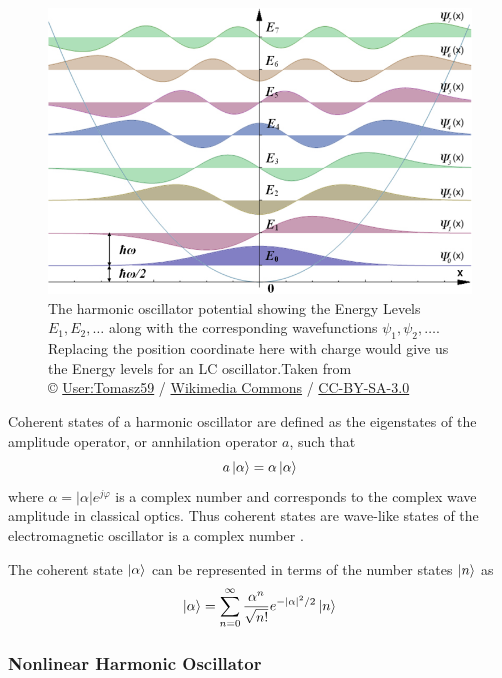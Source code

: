 \begin{figure}
\centering
\includegraphics[width=\linewidth]{Figures/harmonic_oscillator}
\decoRule
\caption[Harmonic Oscillator Energy Levels]{The harmonic oscillator potential showing the Energy Levels $E_1,E_2,\ldots$ along with the corresponding wavefunctions $\psi_1,\psi_2,\ldots$. Replacing the position coordinate here with charge would give us the Energy levels for an LC oscillator.Taken from \\© \href{https://pl.wikipedia.org/wiki/Wikipedysta:Tomasz59}{User:Tomasz59} / \href{http://commons.wikimedia.org/}{Wikimedia Commons} / \href{http://creativecommons.org/licenses/by-sa/3.0/}{CC-BY-SA-3.0}}
\label{fig:harmonic oscillator}
\end{figure}

Coherent states of a harmonic oscillator are defined as the eigenstates of the amplitude operator, or annhilation operator $a$, such that
\begin{equation}
a\ket{\alpha} = \alpha\ket{\alpha}
\end{equation}
where $\alpha = |\alpha|e^{j\varphi}$ is a complex number and corresponds to the complex wave amplitude in classical optics. Thus coherent states are wave-like states of the electromagnetic oscillator is a complex number \cite{Glauber1963}.

The coherent state $\ket{\alpha}$ can be represented in terms of the number states $\ket{n}$ as
\begin{equation}
\ket{\alpha} = \sum_{n=0}^\infty \frac{\alpha^n}{\sqrt{n!}}e^{-|\alpha|^2/2}\ket{n}
\label{eqn:glauber expansion}
\end{equation}

\subsubsection{Nonlinear Harmonic Oscillator}

